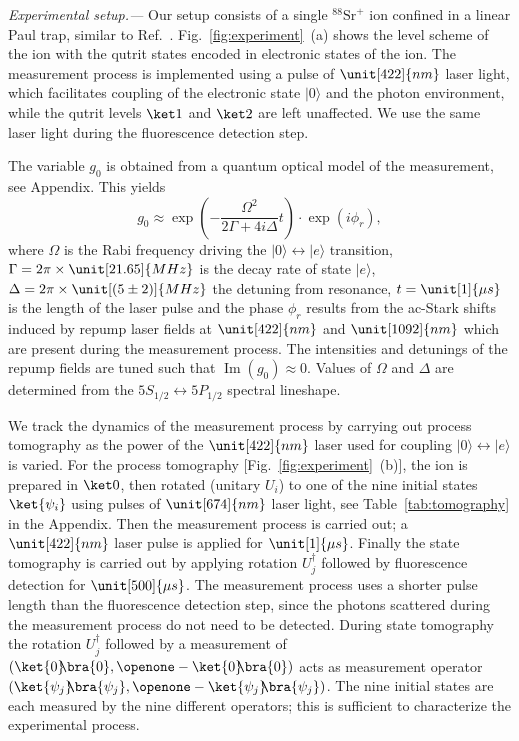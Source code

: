 \documentclass[
aps,prl,
reprint,
a4paper,
superscriptaddress,
floatfix,
]{revtex4-1}
\DeclareMathOperator{\im}{Im}
\newcommand{\ketbra}[2]{{\ket{#1}\!\!\bra{#2}}}
\newcommand{\proj}[1]{{\ketbra{#1}{#1}}}
\begin{document}
{\em Experimental setup.---}%
Our setup consists of a single $^{88}\mathrm{Sr}^{+}$ ion confined in a linear 
 Paul trap, similar to Ref.~\cite{Higgins17}.
Fig.~\ref{fig:experiment}~(a) shows the level scheme of the ion with the qutrit states
 encoded in electronic states of the ion.
The measurement process is implemented using a pulse of $\unit[422]{nm}$ 
 laser light, which facilitates coupling of the electronic state $|0\rangle$
 and the photon environment, while the qutrit levels $\ket1$ and $\ket2$ are left unaffected.
We use the same laser light during the fluorescence detection step.

The variable $g_0$ is obtained from a quantum optical model of the 
 measurement, see Appendix.
This yields
%
\begin{equation}\label{eq:a0}
 g_0\approx \exp\left(-\frac{\Omega^2}{2\Gamma + 4 i \Delta} t\right) \cdot \exp\left(i \phi_{r} \right),
\end{equation}
%
 where $\Omega$ is the Rabi frequency driving the $|0\rangle \leftrightarrow |e\rangle$ transition, $\Gamma= 
 2\pi\times \unit[21.65]{MHz}$ \cite{Gallagher67} is the decay rate of state 
 $|e\rangle$, $\Delta= 2\pi\times \unit[(5\pm2)]{MHz}$ the detuning from 
 resonance, $t= \unit[1]{\mu s}$ is the length of the laser pulse and the phase $\phi_{r}$ results from the ac-Stark shifts induced by repump laser fields at $\unit[422]{nm}$ and $\unit[1092]{nm}$ which are present during the measurement process. The intensities and detunings of the repump fields are tuned such that $\im\left(g_0\right)\approx 0$.
Values of $\Omega$ and $\Delta$ are determined from the $5S_{1/2} \leftrightarrow 5P_{1/2}$ spectral lineshape.

We track the dynamics of the measurement process by carrying out
 process tomography as the power of the $\unit[422]{nm}$ laser used for coupling $|0\rangle \leftrightarrow |e\rangle$ is varied.
For the process tomography [Fig.~\ref{fig:experiment}~(b)], the ion is prepared in $\ket0$, then rotated (unitary $U_i$) to one of the nine 
 initial states $\ket{\psi_i}$ using pulses of $\unit[674]{nm}$ laser light, 
 see Table~\ref{tab:tomography} in the Appendix.
Then the measurement process is carried out; a $\unit[422]{nm}$ laser pulse is applied for $\unit[1]{\mu s}$.
Finally the state 
 tomography is carried out by applying rotation $U_j^\dag$ followed by fluorescence detection for $\unit[500]{\mu s}$.
The measurement process uses a shorter pulse length than the fluorescence detection step, since the photons scattered during the measurement process do not need to be detected.
During state tomography the rotation $U_j^\dag$ followed by a measurement of $(\proj0,\openone-\proj0)$ 
 acts as measurement operator $(\proj{\psi_j},\openone-\proj{\psi_j})$.
The nine initial states are each measured by the nine different operators; this is sufficient to characterize the experimental process.
\end{document}
